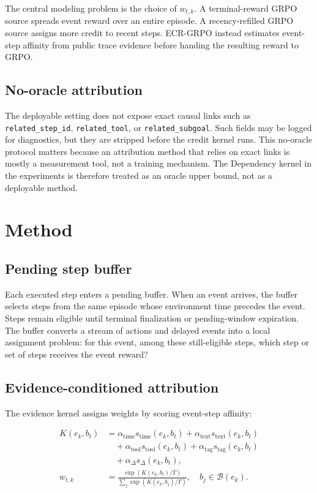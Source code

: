 \documentclass[letterpaper]{article} %
\begin{document}
The central modeling problem is the choice of \(w_{t,k}\). A terminal-reward GRPO source spreads event reward over an entire episode. A recency-refilled GRPO source assigns more credit to recent steps. ECR-GRPO instead estimates event-step affinity from public trace evidence before handing the resulting reward to GRPO.

\subsection{No-oracle attribution}

The deployable setting does not expose exact causal links such as \texttt{related\_step\_id}, \texttt{related\_tool}, or \texttt{related\_subgoal}. Such fields may be logged for diagnostics, but they are stripped before the credit kernel runs. This no-oracle protocol matters because an attribution method that relies on exact links is mostly a measurement tool, not a training mechanism. The Dependency kernel in the experiments is therefore treated as an oracle upper bound, not as a deployable method.

\section{Method}

\subsection{Pending step buffer}

Each executed step enters a pending buffer. When an event arrives, the buffer selects steps from the same episode whose environment time precedes the event. Steps remain eligible until terminal finalization or pending-window expiration. The buffer converts a stream of actions and delayed events into a local assignment problem: for this event, among these still-eligible steps, which step or set of steps receives the event reward?

\subsection{Evidence-conditioned attribution}

The evidence kernel assigns weights by scoring event-step affinity:

\[
\begin{aligned}
K(e_k,b_t) &=
\alpha_{\mathrm{time}} s_{\mathrm{time}}(e_k,b_t)
+ \alpha_{\mathrm{text}} s_{\mathrm{text}}(e_k,b_t) \\
&\quad + \alpha_{\mathrm{tool}} s_{\mathrm{tool}}(e_k,b_t)
+ \alpha_{\mathrm{tag}} s_{\mathrm{tag}}(e_k,b_t) \\
&\quad + \alpha_{\Delta} s_{\Delta}(e_k,b_t), \\
w_{t,k} &= \frac{\exp(K(e_k,b_t)/T)}
{\sum_j \exp(K(e_k,b_j)/T)},\quad b_j\in\mathcal{B}(e_k).
\end{aligned}
\]
\end{document}
